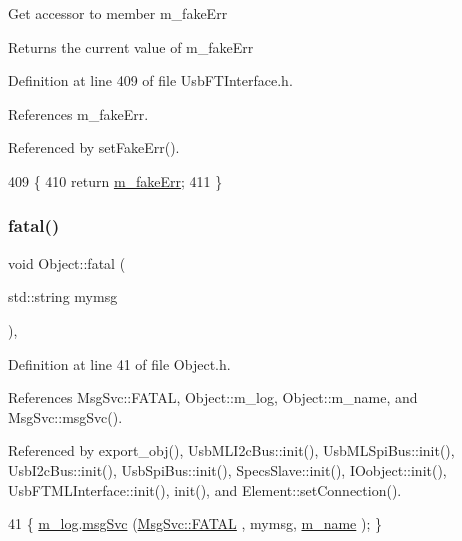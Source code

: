 Get accessor to member m\+\_\+fake\+Err \begin{DoxyReturn}{Returns}
the current value of m\+\_\+fake\+Err 
\end{DoxyReturn}


Definition at line 409 of file Usb\+F\+T\+Interface.\+h.



References m\+\_\+fake\+Err.



Referenced by set\+Fake\+Err().


\begin{DoxyCode}
409                           \{
410     \textcolor{keywordflow}{return} \hyperlink{classUsbFTInterface_ab3660cba031df164b2d2df6e4c40f291}{m\_fakeErr};
411   \}
\end{DoxyCode}
\mbox{\label{classObject_aad5a16aac7516ce65bd5ec02ab07fc80}} 
\subsubsection{\texorpdfstring{fatal()}{fatal()}\hspace{0.1cm}{\footnotesize\ttfamily [1/2]}}
{\footnotesize\ttfamily void Object\+::fatal (\begin{DoxyParamCaption}\item[{std\+::string}]{mymsg }\end{DoxyParamCaption})\hspace{0.3cm}{\ttfamily [inline]}, {\ttfamily [inherited]}}



Definition at line 41 of file Object.\+h.



References Msg\+Svc\+::\+F\+A\+T\+AL, Object\+::m\+\_\+log, Object\+::m\+\_\+name, and Msg\+Svc\+::msg\+Svc().



Referenced by export\+\_\+obj(), Usb\+M\+L\+I2c\+Bus\+::init(), Usb\+M\+L\+Spi\+Bus\+::init(), Usb\+I2c\+Bus\+::init(), Usb\+Spi\+Bus\+::init(), Specs\+Slave\+::init(), I\+Oobject\+::init(), Usb\+F\+T\+M\+L\+Interface\+::init(), init(), and Element\+::set\+Connection().


\begin{DoxyCode}
41 \{ \hyperlink{classObject_a0d269813dd7ac1f24bc143031e2963f2}{m\_log}.\hyperlink{classMsgSvc_ad25f18047920cc59a314e5098259711c}{msgSvc} (\hyperlink{classMsgSvc_ae671eb7301996cd049d2da8a65925926a59c73cb29edfc9cdf35845e2b1301363}{MsgSvc::FATAL}   , mymsg, \hyperlink{classObject_a8b83c95c705d2c3ba0d081fe1710f48d}{m\_name} ); \}
\end{DoxyCode}
\mbox{\label{classObject_ae62acd3d09f716220f75f252dc38bc9a}} 
